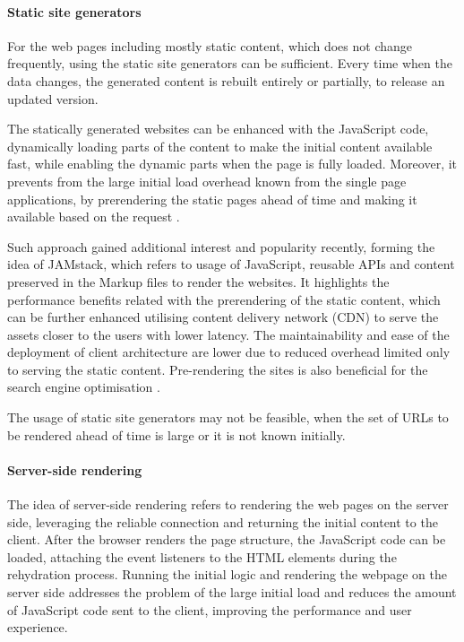 \paragraph*{Static site generators}

For the web pages including mostly static content, which does not change frequently, using the static site generators can be sufficient. Every time when the data changes, the generated content is rebuilt entirely or partially, to release an updated version.

The statically generated websites can be enhanced with the JavaScript code, dynamically loading parts of the content to make the initial content available fast, while enabling the dynamic parts when the page is fully loaded. Moreover, it prevents from the large initial load overhead known from the single page applications, by prerendering the static pages ahead of time and making it available based on the request \cite{GoogleRenderingOnTheWeb}.

Such approach gained additional interest and popularity recently, forming the idea of JAMstack, which refers to usage of JavaScript, reusable APIs and content preserved in the Markup files to render the websites. It highlights the performance benefits related with the prerendering of the static content, which can be further enhanced utilising content delivery network (CDN) to serve the assets closer to the users with lower latency. The maintainability and ease of the deployment of client architecture are lower due to reduced overhead limited only to serving the static content. Pre-rendering the sites is also beneficial for the search engine optimisation \cite{JAMstack}.

The usage of static site generators may not be feasible, when the set of URLs to be rendered ahead of time is large or it is not known initially.

\paragraph*{Server-side rendering}

The idea of server-side rendering refers to rendering the web pages on the server side, leveraging the reliable connection and returning the initial content to the client. After the browser renders the page structure, the JavaScript code can be loaded, attaching the event listeners to the HTML elements during the rehydration process. Running the initial logic and rendering the webpage on the server side addresses the problem of the large initial load and reduces the amount of JavaScript code sent to the client, improving the performance and user experience.

